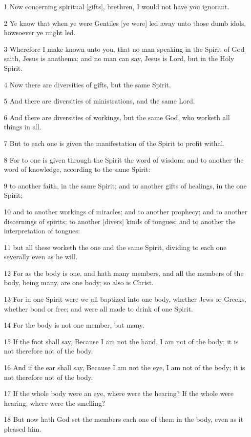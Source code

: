 \par 1 Now concerning spiritual [gifts], brethren, I would not have you ignorant.
\par 2 Ye know that when ye were Gentiles [ye were] led away unto those dumb idols, howsoever ye might led.
\par 3 Wherefore I make known unto you, that no man speaking in the Spirit of God saith, Jesus is anathema; and no man can say, Jesus is Lord, but in the Holy Spirit.
\par 4 Now there are diversities of gifts, but the same Spirit.
\par 5 And there are diversities of ministrations, and the same Lord.
\par 6 And there are diversities of workings, but the same God, who worketh all things in all.
\par 7 But to each one is given the manifestation of the Spirit to profit withal.
\par 8 For to one is given through the Spirit the word of wisdom; and to another the word of knowledge, according to the same Spirit:
\par 9 to another faith, in the same Spirit; and to another gifts of healings, in the one Spirit;
\par 10 and to another workings of miracles; and to another prophecy; and to another discernings of spirits; to another [divers] kinds of tongues; and to another the interpretation of tongues:
\par 11 but all these worketh the one and the same Spirit, dividing to each one severally even as he will.
\par 12 For as the body is one, and hath many members, and all the members of the body, being many, are one body; so also is Christ.
\par 13 For in one Spirit were we all baptized into one body, whether Jews or Greeks, whether bond or free; and were all made to drink of one Spirit.
\par 14 For the body is not one member, but many.
\par 15 If the foot shall say, Because I am not the hand, I am not of the body; it is not therefore not of the body.
\par 16 And if the ear shall say, Because I am not the eye, I am not of the body; it is not therefore not of the body.
\par 17 If the whole body were an eye, where were the hearing? If the whole were hearing, where were the smelling?
\par 18 But now hath God set the members each one of them in the body, even as it pleased him.
